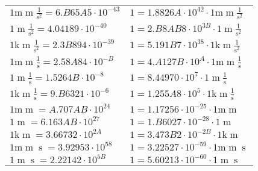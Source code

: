\begin{center}
\begin{longtable}{l l}
{\color{gray}$1 \bm{\mathrm{ m}}{\operatorname{m}}\frac1{\operatorname{s}^2}{}{} = 6.B65A5\cdot10^{-43} $}   & {\color{gray}$ 1 = 1.8826A\cdot10^{42} \cdot 1 \bm{\mathrm{ m}}{\operatorname{m}}\frac1{\operatorname{s}^2}{}{}$}  \\
{\color{black}$1 \bm{\mathrm{ }}{\operatorname{m}}\frac1{\operatorname{s}^2}{}{} = 4.04189\cdot10^{-40} $}   & {\color{black}$ 1 = 2.B8AB8\cdot10^{3B} \cdot 1 \bm{\mathrm{ }}{\operatorname{m}}\frac1{\operatorname{s}^2}{}{}$}  \\
{\color{gray}$1 \bm{\mathrm{ k}}{\operatorname{m}}\frac1{\operatorname{s}^2}{}{} = 2.3B894\cdot10^{-39} $}   & {\color{gray}$ 1 = 5.191B7\cdot10^{38} \cdot 1 \bm{\mathrm{ k}}{\operatorname{m}}\frac1{\operatorname{s}^2}{}{}$}  \\
{\color{gray}$1 \bm{\mathrm{ m}}{\operatorname{m}}\frac1{\operatorname{s}}{}{} = 2.58A84\cdot10^{-B} $}   & {\color{gray}$ 1 = 4.A127B\cdot10^{A} \cdot 1 \bm{\mathrm{ m}}{\operatorname{m}}\frac1{\operatorname{s}}{}{}$}  \\
{\color{black}$1 \bm{\mathrm{ }}{\operatorname{m}}\frac1{\operatorname{s}}{}{} = 1.5264B\cdot10^{-8} $}   & {\color{black}$ 1 = 8.44970\cdot10^{7} \cdot 1 \bm{\mathrm{ }}{\operatorname{m}}\frac1{\operatorname{s}}{}{}$}  \\
{\color{gray}$1 \bm{\mathrm{ k}}{\operatorname{m}}\frac1{\operatorname{s}}{}{} = 9.B6321\cdot10^{-6} $}   & {\color{gray}$ 1 = 1.255A8\cdot10^{5} \cdot 1 \bm{\mathrm{ k}}{\operatorname{m}}\frac1{\operatorname{s}}{}{}$}  \\
{\color{gray}$1 \bm{\mathrm{ m}}{\operatorname{m}}{}{}{} = A.707AB\cdot10^{24} $}   & {\color{gray}$ 1 = 1.17256\cdot10^{-25} \cdot 1 \bm{\mathrm{ m}}{\operatorname{m}}{}{}{}$}  \\
{\color{black}$1 \bm{\mathrm{ }}{\operatorname{m}}{}{}{} = 6.163AB\cdot10^{27} $}   & {\color{black}$ 1 = 1.B6027\cdot10^{-28} \cdot 1 \bm{\mathrm{ }}{\operatorname{m}}{}{}{}$}  \\
{\color{gray}$1 \bm{\mathrm{ k}}{\operatorname{m}}{}{}{} = 3.66732\cdot10^{2A} $}   & {\color{gray}$ 1 = 3.473B2\cdot10^{-2B} \cdot 1 \bm{\mathrm{ k}}{\operatorname{m}}{}{}{}$}  \\
{\color{gray}$1 \bm{\mathrm{ m}}{\operatorname{m}}{\operatorname{s}}{}{} = 3.92953\cdot10^{58} $}   & {\color{gray}$ 1 = 3.22527\cdot10^{-59} \cdot 1 \bm{\mathrm{ m}}{\operatorname{m}}{\operatorname{s}}{}{}$}  \\
{\color{black}$1 \bm{\mathrm{ }}{\operatorname{m}}{\operatorname{s}}{}{} = 2.22142\cdot10^{5B} $}   & {\color{black}$ 1 = 5.60213\cdot10^{-60} \cdot 1 \bm{\mathrm{ }}{\operatorname{m}}{\operatorname{s}}{}{}$}  \\

\end{longtable}
\end{center}

